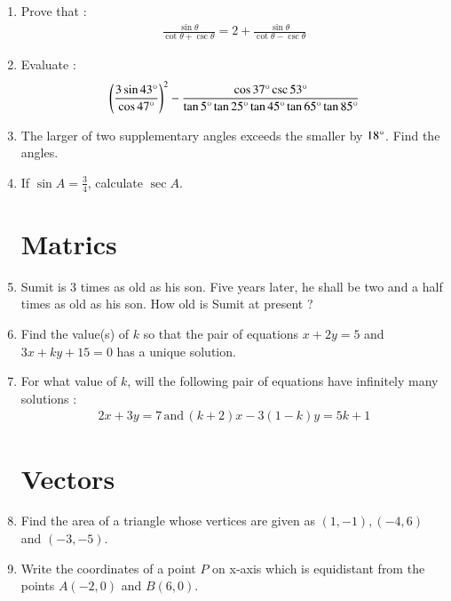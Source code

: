 \documentclass[2pt,-letter paper]{article}
\providecommand{\brak}[1]{\ensuremath{\left(#1\right)}}
\begin{document}
\begin{enumerate}
\item Prove that :
\begin{align*}
    \frac{\sin \theta}{\cot \theta + \csc \theta} = 2 + \frac{\sin \theta}{\cot \theta - \csc \theta}
\end{align*}

\item Evaluate :
\begin{align*}
\left(\frac{3\sin 43\degree}{\cos 47\degree}\right)^2 - \frac{\cos 37\degree \csc 53\degree}{\tan 5\degree \tan 25\degree \tan 45\degree \tan 65\degree \tan 85\degree}
\end{align*}

\item The larger of two supplementary angles exceeds the smaller by $18\degree$. Find the angles.

 \item If $\sin A = \frac{3}{4}$, calculate $\sec A$.



\section{Matrics}

\item Sumit is $3$ times as old as his son. Five years later, he shall be two and a half times as old as his son. How old is Sumit at present ?

 \item Find the value(s) of $k$ so that the pair of equations $x + 2y = 5$ and $3x + ky + 15 = 0$ has a unique solution.

 \item For what value of $k$, will the following pair of equations have infinitely many solutions :
\begin{align*}
	2x + 3y = 7 \hspace{2pt} \text{and} \hspace{2pt} \brak{k+2}x - 3\brak{1-k}y = 5k+1 
\end{align*}


\section{Vectors}


\item Find the area of a triangle whose vertices are given as $\brak{1, - 1}, \brak{- 4, 6}$ and $\brak{ -3, - 5}$.

\item Write the coordinates of a point $P$ on x-axis which is equidistant from the points $A\brak{- 2, 0}$ and $B\brak{6, 0}$.


\end{enumerate}
\end{document}
